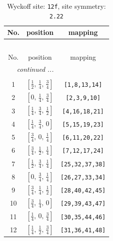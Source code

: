 \documentclass[fleqn,8pt]{jsarticle}
\begin{document}
\begin{longtable}{ccc}
\caption{Wyckoff site: {\tt 12f}, site symmetry: {\tt 2.22}}
 \\
 \hline \hline
No. & position & mapping \\ \hline \endfirsthead

\multicolumn{2}{l}{\tablename\ \thetable{}} \\
 \hline \hline
No. & position & mapping \\ \hline \endhead

 \hline \hline
\multicolumn{2}{r}{\footnotesize\it continued ...} \\ \endfoot

 \hline \hline
\multicolumn{2}{r}{} \\ \endlastfoot

1 & $\left[ \frac{1}{2},\, \frac{1}{4},\, \frac{3}{4} \right]$ & {\tt [1,8,13,14]} \\ \hline
2 & $\left[ 0,\, \frac{1}{4},\, \frac{3}{4} \right]$ & {\tt [2,3,9,10]} \\ \hline
3 & $\left[ \frac{1}{4},\, \frac{3}{4},\, \frac{1}{2} \right]$ & {\tt [4,16,18,21]} \\ \hline
4 & $\left[ \frac{1}{4},\, \frac{3}{4},\, 0 \right]$ & {\tt [5,15,19,23]} \\ \hline
5 & $\left[ \frac{3}{4},\, 0,\, \frac{1}{4} \right]$ & {\tt [6,11,20,22]} \\ \hline
6 & $\left[ \frac{3}{4},\, \frac{1}{2},\, \frac{1}{4} \right]$ & {\tt [7,12,17,24]} \\ \hline
7 & $\left[ \frac{1}{2},\, \frac{3}{4},\, \frac{1}{4} \right]$ & {\tt [25,32,37,38]} \\ \hline
8 & $\left[ 0,\, \frac{3}{4},\, \frac{1}{4} \right]$ & {\tt [26,27,33,34]} \\ \hline
9 & $\left[ \frac{3}{4},\, \frac{1}{4},\, \frac{1}{2} \right]$ & {\tt [28,40,42,45]} \\ \hline
10 & $\left[ \frac{3}{4},\, \frac{1}{4},\, 0 \right]$ & {\tt [29,39,43,47]} \\ \hline
11 & $\left[ \frac{1}{4},\, 0,\, \frac{3}{4} \right]$ & {\tt [30,35,44,46]} \\ \hline
12 & $\left[ \frac{1}{4},\, \frac{1}{2},\, \frac{3}{4} \right]$ & {\tt [31,36,41,48]} \\
\end{longtable}
\renewcommand{\arraystretch}{1.2}
\end{document}
